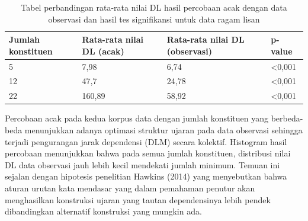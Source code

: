 \begin{table}
\begin{center}
\begin{small}
  \caption{Tabel perbandingan rata-rata nilai DL hasil percobaan acak dengan data observasi dan hasil tes signifikansi untuk data ragam lisan}  \label{tab:perbandingan_DL_lisan}
  \begin{tabular}{ | l | l | l | l |}
    \hline
	 Jumlah konstituen & Rata-rata nilai DL (acak) & Rata-rata nilai DL (observasi) & p-value \\ \hline
	 5 & 7,98 & 6,74 & \textless 0,001 \\ \hline
	 12 & 47,7 & 24,78 & \textless 0,001 \\ \hline
	 22 & 160,89 & 58,92 & \textless 0,001 \\ \hline
  \end{tabular}
  \end{small}
\end{center}
\end{table}

Percobaan acak pada kedua korpus data dengan jumlah konstituen yang berbeda-beda menunjukkan adanya optimasi struktur ujaran pada data observasi sehingga terjadi pengurangan jarak dependensi (DLM) secara kolektif. Histogram hasil percobaan menunjukkan bahwa pada semua jumlah konstituen, distribusi nilai DL data observasi jauh lebih kecil mendekati jumlah minimum. Temuan ini sejalan dengan hipotesis penelitian Hawkins (2014) yang menyebutkan bahwa aturan urutan kata mendasar yang dalam pemahaman penutur akan menghasilkan konstruksi ujaran yang tautan dependensinya lebih pendek dibandingkan alternatif konstruksi yang mungkin ada.

